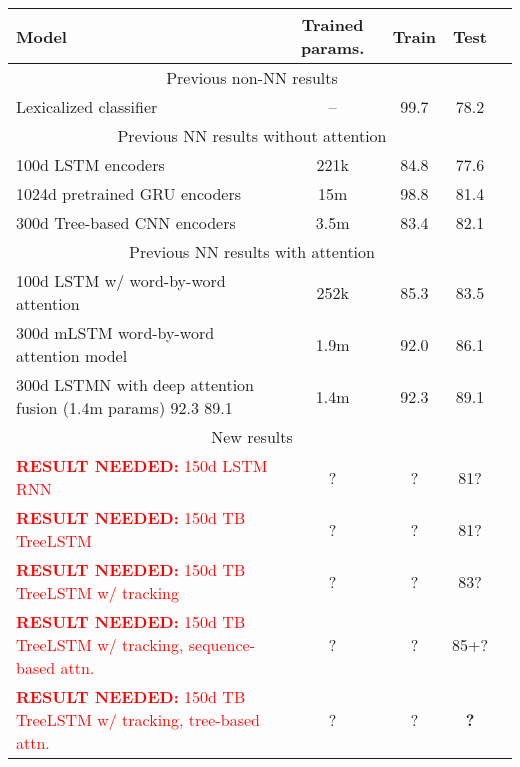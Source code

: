 \documentclass[11pt,letterpaper]{article}
\newcommand\result[1]{\textcolor{red}{\textbf{RESULT NEEDED:} #1}}
\begin{document}
\begin{table*}[t]
  \centering\small
  \begin{tabular}{lcccc} 
    \toprule
Model                   & Trained params.    &   Train  &   Test \\
\midrule
\multicolumn{4}{c}{Previous non-NN results}\\
\midrule
Lexicalized classifier \cite{snli:emnlp2015}
                        & --                 &   99.7   &   78.2      \\
\midrule
\multicolumn{4}{c}{Previous NN results without attention}\\
\midrule
100d LSTM encoders \cite{snli:emnlp2015}
                        & 221k               &   84.8   &   77.6      \\
1024d pretrained GRU encoders \cite{DBLP:journals/corr/VendrovKFU15}
                        & 15m                &   98.8   &   81.4       \\
300d Tree-based CNN encoders \cite{mou2015recognizing}
                        & 3.5m               &   83.4   &   82.1       \\
\midrule
\multicolumn{4}{c}{Previous NN results with attention}\\
\midrule
100d LSTM w/ word-by-word attention \cite{rocktaschel2015reasoning}
                        & 252k               &   85.3   &   83.5       \\
300d mLSTM word-by-word attention model \cite{DBLP:journals/corr/WangJ15b}
                        & 1.9m               &   92.0   &   86.1      \\
300d LSTMN with deep attention fusion \cite{cheng2016long} (1.4m params) 92.3    89.1

                        & 1.4m               &   92.3   &   89.1      \\
\midrule
\multicolumn{4}{c}{New results}\\
\midrule
\result{150d LSTM RNN      }     & ?                  &   ?      &   81?       \\
\result{150d TB TreeLSTM}   
                        & ?                  &   ?      &   81?       \\
\result{150d TB TreeLSTM w/ tracking    }
                        & ?                  &   ?      &   83?       \\
\result{150d TB TreeLSTM w/ tracking, sequence-based attn.   }     
                        & ?                  &   ?      &   85+?       \\
\result{150d TB TreeLSTM w/ tracking, tree-based attn. }           
                        & ?                  &   ?      &   \textbf{?}\\
    \bottomrule
  \end{tabular}
  \protect\caption{\protect\label{tab:results}Results on SNLI 3-way inference classification. All reported figures are percent accuracy. \result{[JG]Add seconds-per-step *if* we get a reasonably well-optimized model in time.}} 
\end{table*}
\end{document}
